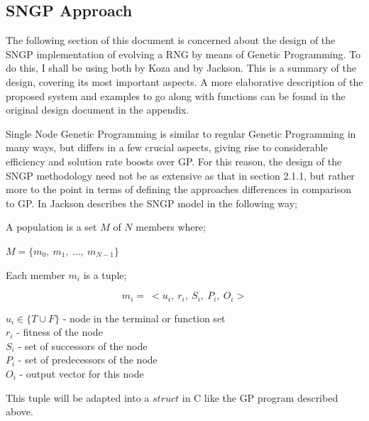 \documentclass[a4paper,10.5pt]{article}
\begin{document}
\subsection{SNGP Approach}

The following section of this document is concerned about the design of the SNGP implementation of evolving a RNG by means of Genetic Programming. To do this, I shall be using both \cite{kozarng} by Koza and \cite{jacksonsngp2} by Jackson. This is a summary of the design, covering its most important aspects. A more elaborative description of the proposed system and examples to go along with functions can be found in the original design document in the appendix. 

Single Node Genetic Programming is similar to regular Genetic Programming in many ways, but differs in a few crucial aspects, giving rise to considerable efficiency and solution rate boosts over GP. For this reason, the design of the SNGP methodology need not be as extensive as that in section 2.1.1, but rather more to the point in terms of defining the approaches differences in comparison to GP. In \cite[p.50-51]{jacksonsngp2} Jackson describes the SNGP model in the following way;

A population is a set $M$ of $N$ members where;
\begin{center}
$M = \{m_0,\ m_1,\ ...,\ m_{N-1}\}$
\end{center}
Each member $m_i$ is a tuple;

\begin{center}
\noindent\begin{minipage}{.5\linewidth}
\begin{equation*}
m_i = \ <u_i,\ r_i,\ S_i,\ P_i,\ O_i>
\end{equation*}
\end{minipage}%
\begin{minipage}{.4\linewidth}
$u_i \in \{T \cup F\}$ - node in the terminal or function set\\
$r_i$ - fitness of the node\\
$S_i$ - set of successors of the node\\
$P_i$ - set of predecessors of the node\\
$O_i$ - output vector for this node\\
\end{minipage}
\end{center}

This tuple will be adapted into a $struct$ in C like the GP program described above.
\end{document}
